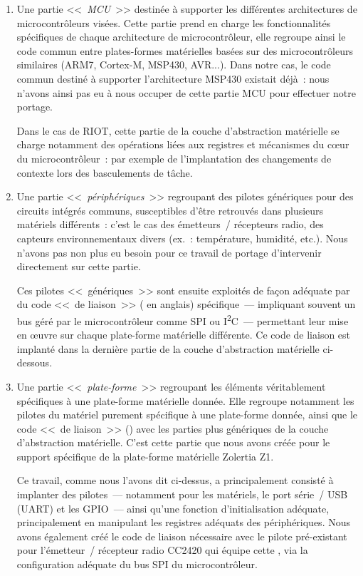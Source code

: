 \begin{enumerate}

\item Une partie <<~\emph{MCU}~>> destinée à supporter les différentes
architectures de microcontrôleurs visées. Cette partie prend en charge les
fonctionnalités spécifiques de chaque architecture de microcontrôleur,
elle regroupe ainsi le code commun entre plates-formes matérielles basées sur
des microcontrôleurs similaires (ARM7, Cortex-M, MSP430, AVR...). Dans notre
cas, le code commun destiné à supporter l'architecture MSP430 existait déjà~:
nous n'avons ainsi pas eu à nous occuper de cette partie MCU pour effectuer
notre portage.

Dans le cas de RIOT, cette partie de la couche d'abstraction matérielle
se charge notamment des opérations liées aux registres et mécanismes du
c{\oe}ur du microcontrôleur~: par exemple de l'implantation des changements
de contexte lors des basculements de tâche.

\item Une partie <<~\emph{périphériques}~>> regroupant des pilotes génériques
pour des circuits intégrés communs, susceptibles d'être retrouvés dans
plusieurs matériels différents~: c'est le cas des émetteurs~/ récepteurs
radio, des capteurs environnementaux divers (ex.~: température, humidité,
etc.). Nous n'avons pas non plus eu besoin pour ce travail de portage
d'intervenir directement sur cette partie.

Ces pilotes <<~génériques~>> sont ensuite exploités de façon adéquate par
du code <<~de liaison~>> ( en anglais) spécifique~---
impliquant souvent un bus géré par le microcontrôleur comme SPI ou
I\textsuperscript{2}C~--- permettant leur mise en {\oe}uvre sur chaque
plate-forme matérielle différente. Ce code de liaison est implanté dans
la dernière partie de la couche d'abstraction matérielle ci-dessous.

\item Une partie <<~\emph{plate-forme}~>> regroupant les éléments
véritablement spécifiques à une plate-forme matérielle donnée. Elle
regroupe notamment les pilotes du matériel purement spécifique à une
plate-forme donnée, ainsi que le code <<~de liaison~>> ()
avec les parties plus génériques de la couche d'abstraction matérielle.
C'est cette partie que nous avons créée pour le support spécifique de
la plate-forme matérielle Zolertia Z1.

Ce travail, comme nous l'avons dit ci-dessus, a principalement consisté
à implanter des pilotes~--- notamment pour les  matériels,
le port série~/ USB (UART) et les GPIO~--- ainsi qu'une fonction
d'initialisation adéquate, principalement en manipulant les registres
adéquats des périphériques. Nous avons également créé le code de liaison
nécessaire avec le pilote pré-existant pour l'émetteur~/ récepteur radio
CC2420 qui équipe cette , via la configuration adéquate du bus
SPI du microcontrôleur.

\end{enumerate}

